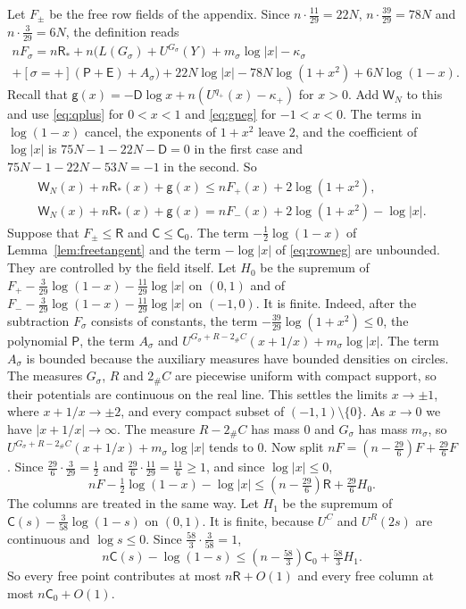 Let $F_\pm$ be the free row fields of the appendix. Since $n\cdot\frac{11}{29}=22N$, $n\cdot\frac{39}{29}=78N$ and $n\cdot\frac3{29}=6N$, the definition reads
\begin{multline*}
 nF_\sigma=n\mathsf R_*+n\bigl(L(G_\sigma)+U^{G_\sigma}(Y)+m_\sigma\log|x|-\kappa_\sigma\\
 +[\sigma=+](\mathsf P+\mathsf E)+A_\sigma\bigr)+22N\log|x|-78N\log(1+x^2)+6N\log(1-x).
\end{multline*}
Recall that $\mathsf g(x)=-\mathsf D\log x+n(U^{q_+}(x)-\kappa_+)$ for $x>0$. Add $\mathsf W_N$ to this and use \eqref{eq:qplus} for $0<x<1$ and \eqref{eq:gneg} for $-1<x<0$. The terms in $\log(1-x)$
cancel, the exponents of $1+x^2$ leave $2$, and the coefficient of $\log|x|$ is $75N-1-22N-\mathsf D=0$ in the first case and $75N-1-22N-53N=-1$ in the second. So
\begin{gather}
 \mathsf W_N(x)+n\mathsf R_*(x)+\mathsf g(x)\le nF_+(x)+2\log(1+x^2),\label{eq:rowpos}\\
 \mathsf W_N(x)+n\mathsf R_*(x)+\mathsf g(x)=nF_-(x)+2\log(1+x^2)-\log|x|.\label{eq:rowneg}
\end{gather}
Suppose that $F_\pm\le\mathsf R$ and $\mathsf C\le\mathsf C_0$.
The term $-\frac12\log(1-x)$ of Lemma~\ref{lem:freetangent} and the term $-\log|x|$ of \eqref{eq:rowneg} are unbounded. They are controlled by the field itself. Let $H_0$ be the supremum of $F_+-\frac3{29}\log(1-x)-\frac{11}{29}\log|x|$ on $(0,1)$ and of $F_--\frac3{29}\log(1-x)-\frac{11}{29}\log|x|$ on $(-1,0)$. It is finite.
Indeed, after the subtraction $F_\sigma$ consists of constants, the term $-\frac{39}{29}\log(1+x^2)\le0$, the polynomial $\mathsf P$, the term $A_\sigma$ and
$U^{G_\sigma+R-2_\#C}(x+1/x)+m_\sigma\log|x|$. The term $A_\sigma$ is bounded because the auxiliary measures have bounded densities on circles. The measures $G_\sigma$, $R$ and $2_\#C$
are piecewise uniform with compact support, so their potentials are continuous on the real line. This settles the limits $x\to\pm1$, where $x+1/x\to\pm2$, and every compact subset of
$(-1,1)\setminus\{0\}$. As $x\to0$ we have $|x+1/x|\to\infty$. The measure $R-2_\#C$ has mass $0$ and $G_\sigma$ has mass $m_\sigma$, so $U^{G_\sigma+R-2_\#C}(x+1/x)+m_\sigma\log|x|$ tends to $0$.
Now split $nF=(n-\frac{29}6)F+\frac{29}6F$. Since $\frac{29}6\cdot\frac3{29}=\frac12$ and $\frac{29}6\cdot\frac{11}{29}=\frac{11}6\ge1$, and since $\log|x|\le0$,
\[
 nF-\tfrac12\log(1-x)-\log|x|\le(n-\tfrac{29}6)\mathsf R+\tfrac{29}6H_0 .
\]
The columns are treated in the same way. Let $H_1$ be the supremum of $\mathsf C(s)-\frac3{58}\log(1-s)$ on $(0,1)$. It is finite, because $U^C$ and $U^R(2s)$ are continuous and
$\log s\le0$. Since $\frac{58}3\cdot\frac3{58}=1$,
\[
 n\mathsf C(s)-\log(1-s)\le(n-\tfrac{58}3)\mathsf C_0+\tfrac{58}3H_1 .
\]
So every free point contributes at most $n\mathsf R+O(1)$ and every free column at most $n\mathsf C_0+O(1)$. 

